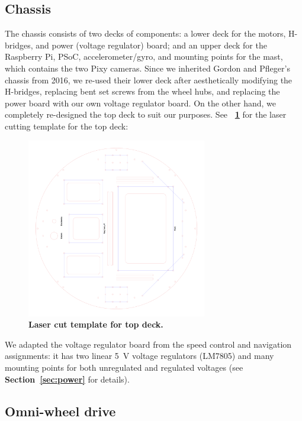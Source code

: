 \documentclass[letterpaper, 11pt]{article}
\newcommand*{\figref}[1]{\textbf{\figurename~\ref{#1}}}
\newcommand*{\secref}[1]{\textbf{Section~\ref{#1}}}
\begin{document}
\begin{enumerate}[label=\textbf{\arabic*.}]
\subsection{Chassis}
The chassis consists of two decks of components: a lower deck for the motors, H-bridges, and power (voltage regulator) board; and an upper deck for the Raspberry Pi, PSoC, accelerometer/gyro, and mounting points for the mast, which contains the two Pixy cameras. Since we inherited Gordon and Pfleger's chassis from 2016, we re-used their lower deck after aesthetically modifying the H-bridges, replacing bent set screws from the wheel hubs, and replacing the power board with our own voltage regulator board. On the other hand, we completely re-designed the top deck to suit our purposes. See \figref{fig:topdeck} for the laser cutting template for the top deck:
\begin{figure}[ht]
    \centering
    \includegraphics[width=0.7\textwidth]{images/topdeck.png}
    \caption{\textbf{Laser cut template for top deck.}}
    \label{fig:topdeck}
\end{figure}

We adapted the voltage regulator board from the speed control and navigation assignments: it has two linear \SI{5}{V} voltage regulators (LM7805) and many mounting points for both unregulated and regulated voltages (see \secref{sec:power} for details).

\subsection{Omni-wheel drive}

\end{enumerate}
\end{document}
